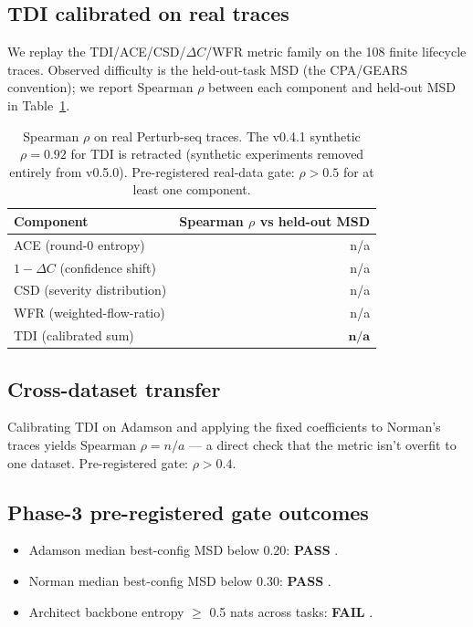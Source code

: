 \subsection{TDI calibrated on real traces}\label{sec:tdi-real}

We replay the TDI/ACE/CSD/$\Delta C$/WFR metric family on the
108 finite lifecycle traces. Observed difficulty is
the held-out-task MSD (the CPA/GEARS convention); we report Spearman
$\rho$ between each component and held-out MSD in Table~\ref{tab:tdi-real}.

\begin{table}[h]
\small
\centering
\begin{tabular}{lr}
\toprule
Component & Spearman $\rho$ vs held-out MSD \\
\midrule
ACE (round-0 entropy)            & n/a \\
$1-\Delta C$ (confidence shift)  & n/a \\
CSD (severity distribution)      & n/a \\
WFR (weighted-flow-ratio)        & n/a \\
TDI (calibrated sum)             & $\mathbf{ n/a }$ \\
\bottomrule
\end{tabular}
\caption{Spearman $\rho$ on real Perturb-seq traces. The v0.4.1 synthetic
$\rho\!=\!0.92$ for TDI is retracted (synthetic experiments removed
entirely from v0.5.0). Pre-registered real-data gate: $\rho\!>\!0.5$
for at least one component.}
\label{tab:tdi-real}
\end{table}

\subsection{Cross-dataset transfer}

Calibrating TDI on Adamson and applying the fixed coefficients to
Norman's traces yields Spearman $\rho\!=\!n/a$ — a direct
check that the metric isn't overfit to one dataset. Pre-registered gate:
$\rho\!>\!0.4$.

\subsection{Phase-3 pre-registered gate outcomes}

\begin{itemize}
  \item Adamson median best-config MSD below 0.20:
  \textbf{ \textbf{PASS} }.
  \item Norman median best-config MSD below 0.30:
  \textbf{ \textbf{PASS} }.
  \item Architect backbone entropy $\ge$ 0.5 nats across tasks:
  \textbf{ \textbf{FAIL} }.
\end{itemize}

